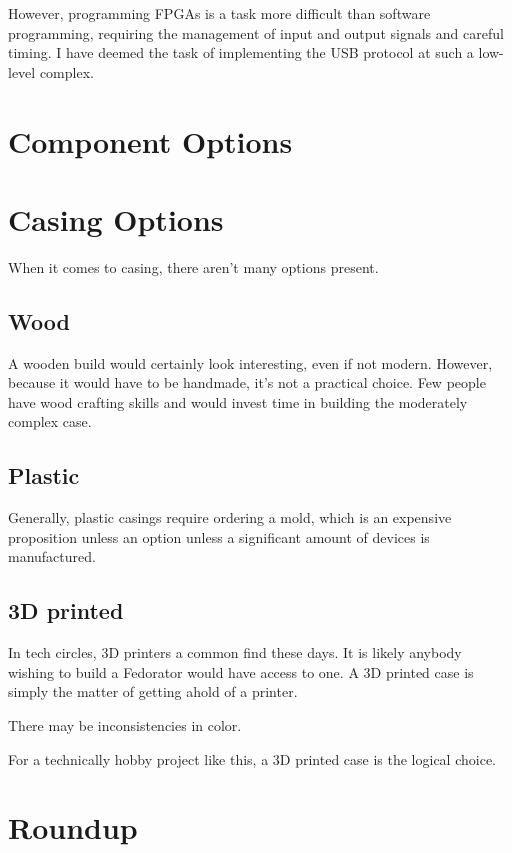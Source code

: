             However, programming FPGAs is a task more difficult than software programming, requiring the management of input and output signals and careful timing.  I have deemed the task of implementing the USB protocol at such a low-level complex.
            
            
        \blind[4]
    \section{Component Options}
    \section{Casing Options}
        When it comes to casing, there aren't many options present.
        \subsection{Wood}
            A wooden build would certainly look interesting, even if not modern.  However, because it would have to be handmade, it's not a practical choice.  Few people have wood crafting skills and would invest time in building the moderately complex case.
        \subsection{Plastic}
            Generally, plastic casings require ordering a mold, which is an expensive proposition unless an option unless a significant amount of devices is manufactured.
        \subsection{3D printed}
            In tech circles, 3D printers a common find these days.  It is likely anybody wishing to build a Fedorator would have access to one.  A 3D printed case is simply the matter of getting ahold of a printer.
            
            There may be inconsistencies in color.  
            
            For a technically hobby project like this, a 3D printed case is the logical choice.
    \section{Roundup}
        \blind[2]
